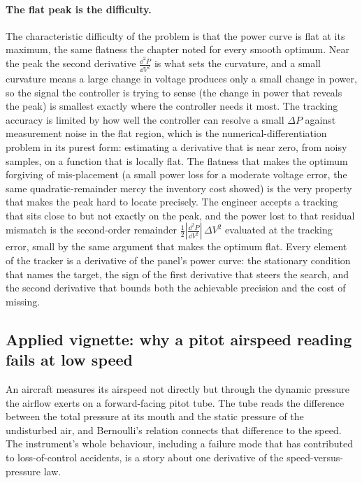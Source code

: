 \paragraph{The flat peak is the difficulty.}
The characteristic difficulty of the problem is that the power curve is
flat at its maximum, the same flatness the chapter noted for every
smooth optimum. Near the peak the second derivative
$\frac{\dd^{2} P}{\dd V^{2}}$ is
what sets the curvature, and a small curvature means a large change in
voltage produces only a small change in power, so the signal the
controller is trying to sense (the change in power that reveals the
peak) is smallest exactly where the controller needs it most. The
tracking accuracy is limited by how well the controller can resolve a
small $\Delta P$ against measurement noise in the flat region, which is
the numerical-differentiation problem in its purest form: estimating a
derivative that is near zero, from noisy samples, on a function that is
locally flat. The flatness that makes the optimum forgiving of
mis-placement (a small power loss for a moderate voltage error, the
same quadratic-remainder mercy the inventory cost showed) is the very
property that makes the peak hard to locate precisely. The engineer
accepts a tracking that sits close to but not exactly on the peak, and
the power lost to that residual mismatch is the second-order remainder
$\tfrac{1}{2}\left|\frac{\dd^{2} P}{\dd V^{2}}\right|\,\Delta V^{2}$
evaluated at the tracking
error, small by the same argument that makes the optimum flat. Every
element of the tracker is a derivative of the panel's power curve: the
stationary condition that names the target, the sign of the first
derivative that steers the search, and the second derivative that
bounds both the achievable precision and the cost of missing.

\subsection{Applied vignette: why a pitot airspeed reading fails at low
speed}

An aircraft measures its airspeed not directly but through the dynamic
pressure the airflow exerts on a forward-facing pitot tube. The tube
reads the difference between the total pressure at its mouth and the
static pressure of the undisturbed air, and Bernoulli's relation
connects that difference to the speed. The instrument's whole behaviour,
including a failure mode that has contributed to loss-of-control
accidents, is a story about one derivative of the speed-versus-pressure
law.

